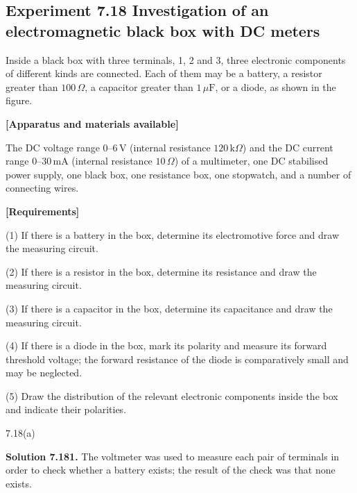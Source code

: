 \subsection*{Experiment 7.18 \quad Investigation of an electromagnetic black box with DC meters}

Inside a black box with three terminals, 1, 2 and 3, three electronic components of different kinds are connected. Each of them may be a battery, a resistor greater than $100\,\Omega$, a capacitor greater than $1\,\mu\mathrm{F}$, or a diode, as shown in the figure.

\textbf{[Apparatus and materials available]}

The DC voltage range $0$--$6$\,V (internal resistance $120\,\mathrm{k}\Omega$) and the DC current range $0$--$30$\,mA (internal resistance $10\,\Omega$) of a multimeter, one DC stabilised power supply, one black box, one resistance box, one stopwatch, and a number of connecting wires.

\textbf{[Requirements]}

(1) If there is a battery in the box, determine its electromotive force and draw the measuring circuit.

(2) If there is a resistor in the box, determine its resistance and draw the measuring circuit.

(3) If there is a capacitor in the box, determine its capacitance and draw the measuring circuit.

(4) If there is a diode in the box, mark its polarity and measure its forward threshold voltage; the forward resistance of the diode is comparatively small and may be neglected.

(5) Draw the distribution of the relevant electronic components inside the box and indicate their polarities.

\begin{figbox}{7.18(a)}
\end{figbox}

\textbf{Solution 7.18}\quad \textbf{1.} The voltmeter was used to measure each pair of terminals in order to check whether a battery exists; the result of the check was that none exists.

